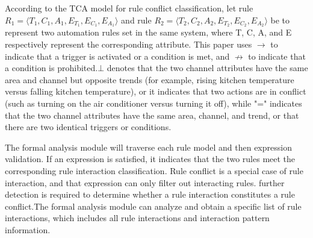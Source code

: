 According to the TCA model for rule conflict classification, let rule $R_1=\langle T_1,C_1,A_1,E_{T_1},E_{C_1},E_{A_1} \rangle$ and rule  $R_2=\langle T_2,C_2,A_2,E_{T_2},E_{C_2},E_{A_2} \rangle$ be to represent two automation rules set in the same system, where T, C, A, and E respectively represent the corresponding attribute. This paper uses $\rightarrow$ to indicate that a trigger is activated or a condition is met, and $\nrightarrow$ to indicate that a condition is prohibited.$\bot$ denotes that the two channel attributes have the same area and channel but opposite trends (for example, rising kitchen temperature versus falling kitchen temperature), or it indicates that two actions are in conflict (such as turning on the air conditioner versus turning it off), while "=" indicates that the two channel attributes have the same area, channel, and trend, or that there are two identical triggers or conditions.

The formal analysis module will traverse each rule model and then expression validation. If an expression is satisfied, it indicates that the two rules meet the corresponding rule interaction classification. Rule conflict is a special case of rule interaction, and that expression can only filter out interacting rules. further detection is required to determine whether a rule interaction constitutes a rule conflict.The formal analysis module can analyze and obtain a specific list of rule interactions, which includes all rule interactions and interaction pattern information.

